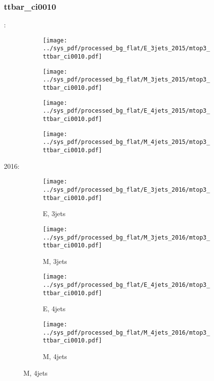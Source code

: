 \documentclass{beamer}
\begin{document}
\begin{frame}
\frametitle{ttbar_ci0010}
\fontsize{5}{1}:
\begin{figure}
\centering
\begin{subfigure}[b]{0.24\textwidth}
\texttt{[image: ../sys\_pdf/processed\_bg\_flat/E\_3jets\_2015/mtop3\_ttbar\_ci0010.pdf]}
\end{subfigure}
\begin{subfigure}[b]{0.24\textwidth}
\texttt{[image: ../sys\_pdf/processed\_bg\_flat/M\_3jets\_2015/mtop3\_ttbar\_ci0010.pdf]}
\end{subfigure}
\begin{subfigure}[b]{0.24\textwidth}
\texttt{[image: ../sys\_pdf/processed\_bg\_flat/E\_4jets\_2015/mtop3\_ttbar\_ci0010.pdf]}
\end{subfigure}
\begin{subfigure}[b]{0.24\textwidth}
\texttt{[image: ../sys\_pdf/processed\_bg\_flat/M\_4jets\_2015/mtop3\_ttbar\_ci0010.pdf]}
\end{subfigure}
\end{figure}
2016:
\begin{figure}
\centering
\begin{subfigure}[b]{0.24\textwidth}
\texttt{[image: ../sys\_pdf/processed\_bg\_flat/E\_3jets\_2016/mtop3\_ttbar\_ci0010.pdf]}
\captionsetup{font=tiny}
\caption{E, 3jets}
\end{subfigure}
\begin{subfigure}[b]{0.24\textwidth}
\texttt{[image: ../sys\_pdf/processed\_bg\_flat/M\_3jets\_2016/mtop3\_ttbar\_ci0010.pdf]}
\captionsetup{font=tiny}
\caption{M, 3jets}
\end{subfigure}
\begin{subfigure}[b]{0.24\textwidth}
\texttt{[image: ../sys\_pdf/processed\_bg\_flat/E\_4jets\_2016/mtop3\_ttbar\_ci0010.pdf]}
\captionsetup{font=tiny}
\caption{E, 4jets}
\end{subfigure}
\begin{subfigure}[b]{0.24\textwidth}
\texttt{[image: ../sys\_pdf/processed\_bg\_flat/M\_4jets\_2016/mtop3\_ttbar\_ci0010.pdf]}
\captionsetup{font=tiny}
\caption{M, 4jets}
\end{subfigure}
\end{figure}
\end{frame}
\end{document}
